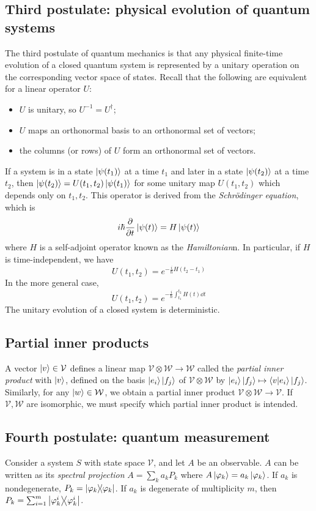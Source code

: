 \subsection{Third postulate: physical evolution of quantum systems}
The third postulate of quantum mechanics is that any physical finite-time evolution of a closed quantum system is represented by a unitary operation on the corresponding vector space of states.
Recall that the following are equivalent for a linear operator \( U \):
\begin{itemize}
    \item \( U \) is unitary, so \( U^{-1} = U^\dagger \);
    \item \( U \) maps an orthonormal basis to an orthonormal set of vectors;
    \item the columns (or rows) of \( U \) form an orthonormal set of vectors.
\end{itemize}
If a system is in a state \( \ket{\psi(t_1)} \) at a time \( t_1 \) and later in a state \( \ket{\psi(t_2)} \) at a time \( t_2 \), then \( \ket{\psi(t_2)} = U(t_1, t_2) \ket{\psi(t_1)} \) for some unitary map \( U(t_1, t_2) \) which depends only on \( t_1, t_2 \).
This operator is derived from the \emph{Schr\"odinger equation}, which is
\[ i\hbar \pdv{t} \ket{\psi(t)} = H \ket{\psi(t)} \]
where \( H \) is a self-adjoint operator known as the \emph{Hamiltonian}n.
In particular, if \( H \) is time-independent, we have
\[ U(t_1, t_2) = e^{-\frac{i}{\hbar} H(t_2 - t_1)} \]
In the more general case,
\[ U(t_1, t_2) = e^{-\frac{i}{\hbar} \int_{t_1}^{t_2} H(t) \dd{t}} \]
The unitary evolution of a closed system is deterministic.

\subsection{Partial inner products}
A vector \( \ket{v} \in \mathcal V \) defines a linear map \( \mathcal V \otimes \mathcal W \to \mathcal W \) called the \emph{partial inner product} with \( \ket{v} \), defined on the basis \( \ket{e_i} \ket{f_j} \) of \( \mathcal V \otimes \mathcal W \) by \( \ket{e_i} \ket{f_j} \mapsto \ip{v}{e_i} \ket{f_j} \).
Similarly, for any \( \ket{w} \in \mathcal W \), we obtain a partial inner product \( \mathcal V \otimes \mathcal W \to \mathcal V \).
If \( \mathcal V, \mathcal W \) are isomorphic, we must specify which partial inner product is intended.

\subsection{Fourth postulate: quantum measurement}
Consider a system \( S \) with state space \( \mathcal V \), and let \( A \) be an observable.
\( A \) can be written as its \emph{spectral projection} \( A = \sum_k a_k P_k \) where \( A \ket{\varphi_k} = a_k \ket{\varphi_k} \).
If \( a_k \) is nondegenerate, \( P_k = \op{\varphi_k}{\varphi_k} \).
If \( a_k \) is degenerate of multiplicity \( m \), then \( P_k = \sum_{i=1}^m \op{\varphi_k^i}{\varphi_k^i} \).

